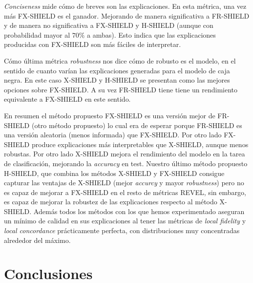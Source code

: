 \textit{Conciseness} mide cómo de breves son las explicaciones. En esta métrica, una vez más FX-SHIELD es el ganador. Mejorando de manera significativa a FR-SHIELD y de manera no significativa a FX-SHIELD y H-SHIELD (aunque con probabilidad mayor al $70\%$ a ambas). Esto indica que las explicaciones producidas con FX-SHIELD son más fáciles de interpretar.

Cómo última métrica \textit{robustness} nos dice cómo de robusto es el modelo, en el sentido de cuanto varían las explicaciones generadas para el modelo de caja negra. En este caso X-SHIELD y H-SHIELD se presentan como las mejores opciones sobre FX-SHIELD. A su vez FR-SHIELD tiene tiene un rendimiento equivalente a FX-SHIELD en este sentido. 

En resumen el método propuesto FX-SHIELD es una versión mejor de FR-SHIELD (otro método propuesto) lo cual era de esperar porque FR-SHIELD es una versión aleatoria (menos informada) que FX-SHIELD. Por otro lado FX-SHIELD produce explicaciones más interpretables que X-SHIELD, aunque menos robustas. Por otro lado X-SHIELD mejora el rendimiento del modelo en la tarea de clasificación, mejorando la \textit{accuracy} en test. Nuestro último método propuesto H-SHIELD, que combina los métodos X-SHIELD y FX-SHIELD consigue capturar las ventajas de X-SHIELD (mejor \textit{accurcy} y mayor \textit{robustness}) pero no es capaz de mejorar a FX-SHIELD en el resto de métricas REVEL, sin embargo, es capaz de mejorar la robustez de las explicaciones respecto al método X-SHIELD. Además todos los métodos con los que hemos experimentado aseguran un mínimo de calidad en sus explicaciones al tener las métricas de \textit{local fidelity} y \textit{local concordance} prácticamente perfecta, con distribuciones muy concentradas alrededor del máximo.

\clearpage
\chapter{Conclusiones} \label{cap:conc}

